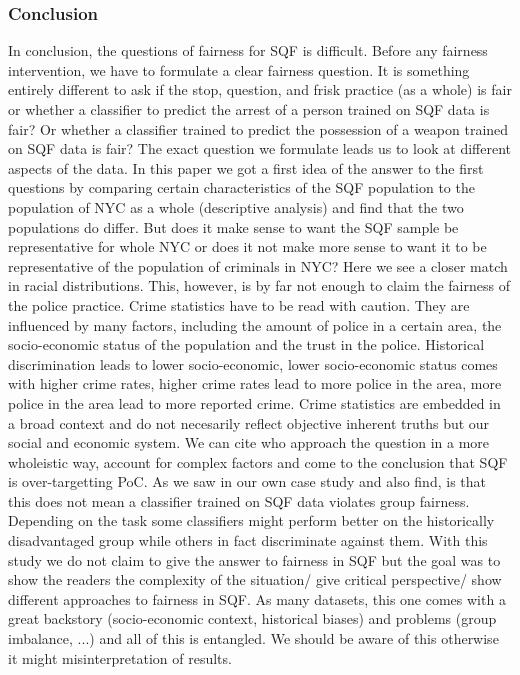 \subsubsection*{Conclusion}
In conclusion, the questions of fairness for SQF is difficult.
Before any fairness intervention, we have to formulate a clear fairness question. It is something entirely different to ask if the stop, question, and frisk practice (as a whole) is fair or whether a classifier to predict the arrest of a person trained on SQF data is fair? Or whether a classifier trained to predict the possession of a weapon trained on SQF data is fair?
The exact question we formulate leads us to look at different aspects of the data. In this paper we got a first idea of the answer to the first questions by comparing certain characteristics of the SQF population to the population of NYC as a whole (descriptive analysis) and find that the two populations do differ. But does it make sense to want the SQF sample be representative for whole NYC or does it not make more sense to want it to be representative of the population of criminals in NYC?
Here we see a closer match in racial distributions. This, however, is by far not enough to claim the fairness of the police practice. Crime statistics have to be read with caution. They are influenced by many factors, including the amount of police in a certain area, the socio-economic status of the population and the trust in the police. Historical discrimination leads to lower socio-economic, lower socio-economic status comes with higher crime rates, higher crime rates lead to more police in the area, more police in the area lead to more reported crime. Crime statistics are embedded in a broad context and do not necesarily reflect objective inherent truths but our social and economic system.
We can cite \cite{goel2016} who approach the question in a more wholeistic way, account for complex factors and come to the conclusion that SQF is over-targetting PoC.
As we saw in our own case study and \cite{Badr2022DTFANSP} also find, is that this does not mean a classifier trained on SQF data violates group fairness. Depending on the task some classifiers might perform better on the historically disadvantaged group while others in fact discriminate against them.
With this study we do not claim to give the answer to fairness in SQF but the goal was to show the readers the complexity of the situation/ give critical perspective/ show different approaches to fairness in SQF. As many datasets, this one comes with a great backstory (socio-economic context, historical biases) and problems (group imbalance, ...) and all of this is entangled. We should be aware of this otherwise it might misinterpretation of results.


